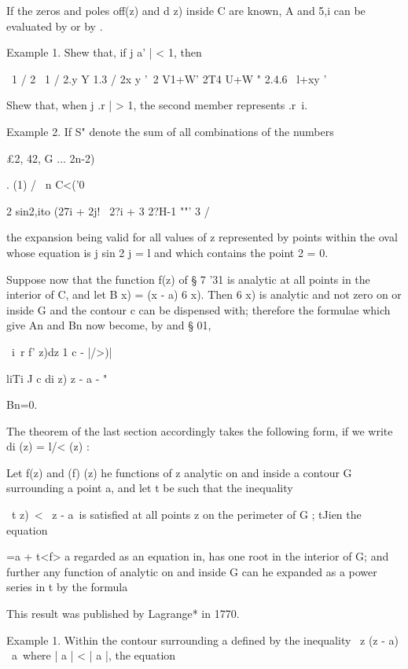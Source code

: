 If the zeros and poles off(z) and d z) inside C are known, A and 5,i
can be evaluated by or by .

Example 1. Shew that, if j a' | < 1, then

\ 1 / 2 \ 1 / 2.y Y 1.3 / 2x y '~2 V1+W' 2T4 U+W " 2.4.6 \ l+xy '

Shew that, when j .r | > 1, the second member represents .r~i.

Example 2. If S" denote the sum of all combinations of the numbers

£2, 42, G ... 2n-2)%

. (1) / \ n C<('0

2 sin2,ito (27i + 2j! \ 2?i + 3 2?H-1 ""' 3 /

the expansion being valid for all values of z represented by points
within the oval whose equation is j sin 2 j = l and which contains the
point 2 = 0. 


Suppose now that the function f(z) of § 7 '31 is analytic at all
points in the interior of C, and let B x) = (x - a) 6 x). Then 6 x) is
analytic and not zero on or inside G and the contour c can be
dispensed with; therefore the formulae which give An and Bn now
become, by and § 01,

\ i\ r f' z)dz 1 c - |/>)|

liTi J c di z) z - a - "

Bn=0.

%
%

The theorem of the last section accordingly takes the following form,
if we write di (z) = l/< (z) :

Let f(z) and (f) (z) he functions of z analytic on and inside a
contour G surrounding a point a, and let t be such that the inequality

\ t z)\ < \ z - a\ is satisfied at all points z on the perimeter of G
; tJien the equation

 =a + t<f> a regarded as an equation in, has one root in the interior
of G; and further any function of analytic on and inside G can he
expanded as a power series in t by the formula

This result was published by Lagrange* in 1770.

Example 1. Within the contour surrounding a defined by the inequality
\ z (z - a) \ a\, where | a | < | a |, the equation

